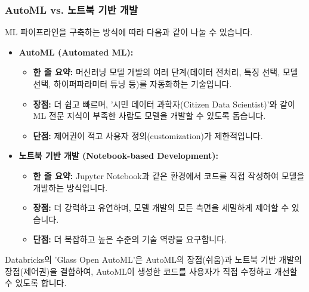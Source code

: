 \documentclass[11pt,a4paper]{article}
\begin{document}
\subsubsection*{AutoML vs. 노트북 기반 개발}
ML 파이프라인을 구축하는 방식에 따라 다음과 같이 나눌 수 있습니다.
\begin{itemize}
    \item \textbf{AutoML (Automated ML):}
    \begin{itemize}
        \item \textbf{한 줄 요약:} 머신러닝 모델 개발의 여러 단계(데이터 전처리, 특징 선택, 모델 선택, 하이퍼파라미터 튜닝 등)를 자동화하는 기술입니다.
        \item \textbf{장점:} 더 쉽고 빠르며, '시민 데이터 과학자(Citizen Data Scientist)'와 같이 ML 전문 지식이 부족한 사람도 모델을 개발할 수 있도록 돕습니다.
        \item \textbf{단점:} 제어권이 적고 사용자 정의(customization)가 제한적입니다.
    \end{itemize}
    \item \textbf{노트북 기반 개발 (Notebook-based Development):}
    \begin{itemize}
        \item \textbf{한 줄 요약:} Jupyter Notebook과 같은 환경에서 코드를 직접 작성하여 모델을 개발하는 방식입니다.
        \item \textbf{장점:} 더 강력하고 유연하며, 모델 개발의 모든 측면을 세밀하게 제어할 수 있습니다.
        \item \textbf{단점:} 더 복잡하고 높은 수준의 기술 역량을 요구합니다.
    \end{itemize}
\end{itemize}
Databricks의 'Glass Open AutoML'은 AutoML의 장점(쉬움)과 노트북 기반 개발의 장점(제어권)을 결합하여, AutoML이 생성한 코드를 사용자가 직접 수정하고 개선할 수 있도록 합니다.
\end{document}
